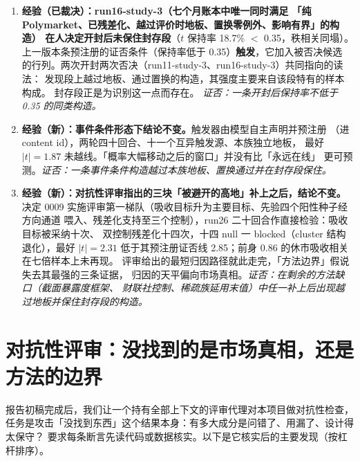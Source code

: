 \documentclass[11pt]{ctexart}
\begin{document}
\begin{enumerate}
{candidate。}\emph{证否：修正后重跑，判决分布改变。}
\item \textbf{经验（已裁决）：run16-study-3（七个月账本中唯一同时满足
「纯 Polymarket、已残差化、越过评价时地板、置换零例外、影响有界」的构造）
在人决定开封后未保住封存段}（$t$ 保持率 18.7\% $<$ 0.35，秩相关同塌）。
上一版本条预注册的证否条件（保持率低于 0.35）\textbf{触发}，它加入被否决候选
的行列。两次开封两次否决（run11-study-3、run16-study-3）共同指向的读法：
发现段上越过地板、通过置换的构造，其强度主要来自该段特有的样本构成。
封存段正是为识别这一点而存在。
\emph{证否：一条开封后保持率不低于 0.35 的同类构造。}
\item \textbf{经验（新）：事件条件形态下结论不变。}触发器由模型自主声明并预注册
（进 content id），两轮四十回合、十一个互异触发源、本族独立地板，
最好 $|t|=1.87$ 未越线。「概率大幅移动之后的窗口」并没有比「永远在线」
更可预测。\emph{证否：一条事件条件构造越过本族地板、置换通过并在封存段保住。}
\item \textbf{经验（新）：对抗性评审指出的三块「被避开的高地」补上之后，结论不变。}
决定 0009 实施评审第一梯队（吸收目标升为主要目标、先验四个阳性种子经方向通道
喂入、残差化支持至三个控制），run26 二十回合作直接检验：吸收目标被采纳十次、
双控制残差化十四次，十四 null 一 blocked（cluster 结构退化），最好 $|t|=2.31$
低于其预注册证否线 2.85；前身 $0.86$ 的休市吸收相关在七倍样本上未再现。
评审给出的最短归因路径就此走完，「方法边界」假说失去其最强的三条证据，
归因的天平偏向市场真相。\emph{证否：在剩余的方法缺口（截面暴露度框架、
财联社控制、稀疏族延用末值）中任一补上后出现越过地板并保住封存段的构造。}
\end{enumerate}

\section{对抗性评审：没找到的是市场真相，还是方法的边界}\label{sec:adversarial}
报告初稿完成后，我们让一个持有全部上下文的评审代理对本项目做对抗性检查，
任务是攻击「没找到东西」这个结果本身：有多大成分是问错了、用漏了、设计得太保守？
要求每条断言先读代码或数据核实。以下是它核实后的主要发现（按杠杆排序）。
\end{document}
